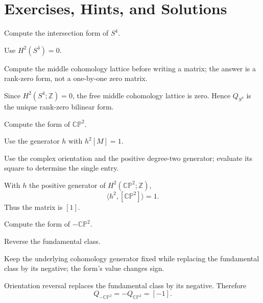 \section{Exercises, Hints, and Solutions}
\begin{exercise}\label{exr:viii34-01}
Compute the intersection form of $S^4$.
\end{exercise}
\begin{hint}
Use $H^2(S^4)=0$.

Compute the middle cohomology lattice before writing a matrix; the answer is a rank-zero form, not a one-by-one zero matrix.
\end{hint}
\begin{solution}
Since \(H^2(S^4;\mathbb Z)=0\), the free middle cohomology lattice is zero. Hence \(Q_{S^4}\) is the unique rank-zero bilinear form.
\end{solution}

\begin{exercise}\label{exr:viii34-02}
Compute the form of $\mathbb{CP}^2$.
\end{exercise}
\begin{hint}
Use the generator $h$ with $h^2[M]=1$.

Use the complex orientation and the positive degree-two generator; evaluate its square to determine the single entry.
\end{hint}
\begin{solution}
With \(h\) the positive generator of \(H^2(\mathbb{CP}^2;\mathbb Z)\),
\[
\langle h^2,[\mathbb{CP}^2]\rangle=1.
\]
Thus the matrix is \([1]\).
\end{solution}

\begin{exercise}\label{exr:viii34-03}
Compute the form of $-\mathbb{CP}^2$.
\end{exercise}
\begin{hint}
Reverse the fundamental class.

Keep the underlying cohomology generator fixed while replacing the fundamental class by its negative; the form's value changes sign.
\end{hint}
\begin{solution}
Orientation reversal replaces the fundamental class by its negative. Therefore
\[
Q_{-\mathbb{CP}^2}=-Q_{\mathbb{CP}^2}=[-1].
\]
\end{solution}

